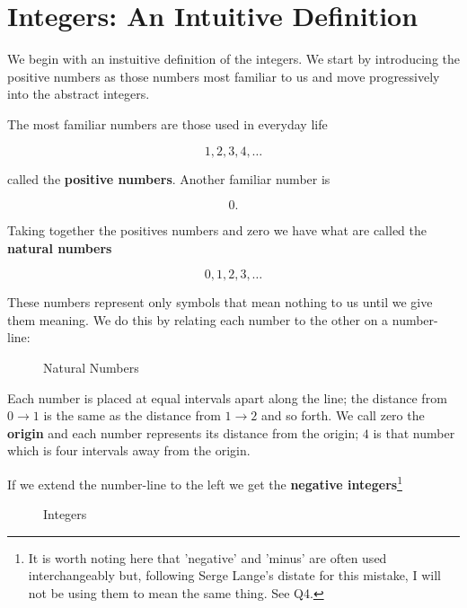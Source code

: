 \section{Integers: An Intuitive Definition}

\begin{introduction}
    We begin with an instuitive definition of the integers. We start by introducing the positive numbers as
    those numbers most familiar to us and move progressively into the abstract integers.
\end{introduction}

The most familiar numbers are those used in everyday life

  $$
    1,2,3,4,\dots
  $$

called the \textbf{positive numbers}. Another familiar number is

  $$
    0.
  $$

Taking together the positives numbers and zero we have what are called the \textbf{natural numbers}

  $$
    0,1,2,3,\dots
  $$

These numbers represent only symbols that mean nothing to us until we give them meaning.
We do this by relating each number to the other on a number-line:

\begin{figure}[h]
  \centering
    \caption{Natural Numbers}
    \label{fig: natural numbers}
\end{figure}

Each number is placed at equal intervals apart along the line; the distance from $0 \to 1$ is the same as the
distance from $1 \to 2$ and so forth. We call zero the \textbf{origin} and each number represents its distance
from the origin; $4$ is that number which is four intervals away from the origin.

If we extend the number-line to the left we get the \textbf{negative integers}\footnote{It is worth noting here
that 'negative' and 'minus' are often used interchangeably but, following Serge Lange's distate for this mistake,
I will not be using them to mean the same thing. See Q4.}

\begin{figure}[h]
  \centering
    \caption{Integers}
    \label{fig: Integers}
\end{figure}

